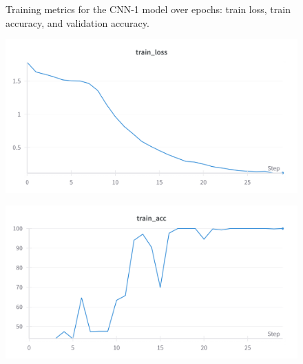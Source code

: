 \documentclass{article}
\begin{document}
\begin{figure}[hbtp]
    \caption{Training metrics for the CNN-1 model over epochs: train loss, train accuracy, and validation accuracy.}
    \label{fig:cnn1_training_metrics}
\end{figure}

\begin{figure}[hbtp]
    \centering

    \begin{minipage}{0.6\textwidth}
        \centering
        \includegraphics[width=\textwidth]{Images/cnn2_train_loss.png}
        \label{fig:cnn2_train_loss}
    \end{minipage}

    \vspace*{0.4cm}

    \begin{minipage}{0.6\textwidth}
        \centering
        \includegraphics[width=\textwidth]{Images/cnn2_train_acc.png}
        \label{fig:cnn2_train_acc}
    \end{minipage}

    \vspace*{0.4cm}


\end{figure}
\end{document}

